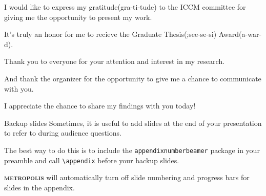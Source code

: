 \documentclass[10pt]{beamer}
\newcommand{\themename}{\textbf{\textsc{metropolis}}\xspace}
\begin{document}
\begin{CJK}{UTF8}{gbsn}
{  I would like to express my gratitude(gra-ti-tude) to the ICCM committee for giving me the opportunity to present my work. 
  
  It’s truly an honor for me to recieve the Graduate Thesis(;see-se-si) Award(a-war-d).

  Thank you to everyone for your attention and interest in my research. 

  And thank the organizer for the opportunity to give me a chance to communicate with you.

  I appreciate the chance to share my findings with you today!
}
\appendix

\begin{frame}[fragile]{Backup slides}
 Sometimes, it is useful to add slides at the end of your presentation to
 refer to during audience questions.

 The best way to do this is to include the \verb|appendixnumberbeamer|
 package in your preamble and call \verb|\appendix| before your backup slides.

  \themename will automatically turn off slide numbering and progress bars for
 slides in the appendix.%
\end{frame}



\end{CJK}
\end{document}
